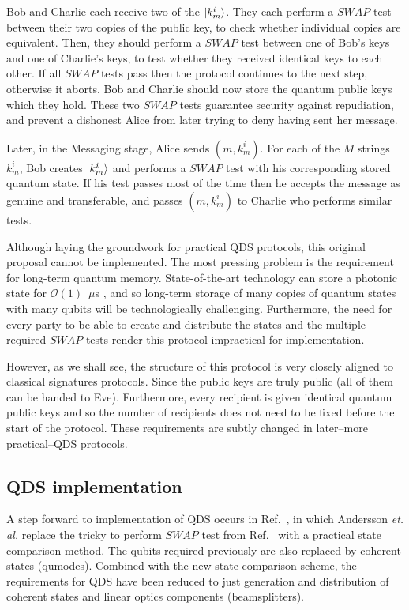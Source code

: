 Bob and Charlie each receive two of the $\ket{k_m^i}$. They each perform a $SWAP$ test between their two copies of the public key, to check whether individual copies are equivalent.  Then, they should perform a $SWAP$ test between one of Bob's keys and one of Charlie's keys, to test whether they received identical keys to each other. If all $SWAP$ tests pass then the protocol continues to the next step, otherwise it aborts. Bob and Charlie should now store the quantum public keys which they hold. These two $SWAP$ tests guarantee security against repudiation, and prevent a dishonest Alice from later trying to deny having sent her message.

Later, in the Messaging stage, Alice sends $\left(m, k_m^i\right)$. For each of the $M$ strings $k_m^i$, Bob creates $\ket{k_m^i}$ and performs a $SWAP$ test with his corresponding stored quantum state. If his test passes most of the time then he accepts the message as genuine and transferable, and passes $\left(m, k_m^i\right)$ to Charlie who performs similar tests. 

Although laying the groundwork for practical QDS protocols, this original proposal cannot be implemented. The most pressing problem is the requirement for long-term quantum memory. State-of-the-art technology can store a photonic state for $\mathcal{O}\left(1\right)$~$\mu$s \cite{Wang2019d}, and so long-term storage of many copies of quantum states with many qubits will be technologically challenging. Furthermore, the need for every party to be able to create and distribute the states and the multiple required $SWAP$ tests render this protocol impractical for implementation. 

However, as we shall see, the structure of this protocol is very closely aligned to classical signatures protocols. Since the public keys are truly public (all of them can be handed to Eve). Furthermore, every recipient is given identical quantum public keys and so the number of recipients does not need to be fixed before the start of the protocol. These requirements are subtly changed in later--more practical--QDS protocols. %


\subsection{QDS implementation}
A step forward to implementation of QDS occurs in Ref.~\cite{Andersson2006}, in which Andersson \emph{et. al.} replace the tricky to perform $SWAP$ test from Ref.~\cite{Gottesman2001} with a practical state comparison method. The qubits required previously are also replaced by coherent states (qumodes). Combined with the new state comparison scheme, the requirements for QDS have been reduced to just generation and distribution of coherent states and linear optics components (beamsplitters).

